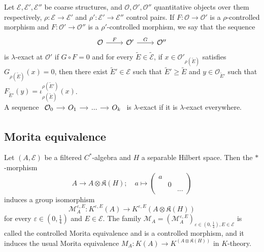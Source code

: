 \begin{definition}
Let $\mathcal E,\mathcal E',\mathcal E''$ be coarse structures, and $ \mathcal O,\mathcal O',\mathcal O''$ quantitative objects over them respectively, $\rho : \mathcal E\rightarrow \mathcal E'$ and $\rho' : \mathcal E'\rightarrow \mathcal E''$ control pairs. If $F : \mathcal O\rightarrow \mathcal O'$ is a $\rho$-controlled morphism and $F : \mathcal O'\rightarrow \mathcal O''$ is a $\rho'$-controlled morphism, we say that the sequence 
\[\begin{tikzcd}\mathcal O\arrow{r}{F} & \mathcal O'\arrow{r}{G} & \mathcal O''\end{tikzcd}\] 
is $\lambda$-exact at $\mathcal O'$ if $G\circ F = 0$ and for every $\tilde{ E}\in \tilde{\mathcal E}$, if $x \in \mathcal O'_{\rho (\tilde{E})}$ satisfies $G_{\rho (\tilde E)}(x)=0$, then there exist $\tilde E'\in \mathcal E$ such that $\tilde E'\geq \tilde E$ and $y\in \mathcal O_{\tilde E'}$ such that $F_{\tilde E'}(y)=\iota_{\rho(\tilde E)}^{\rho(\tilde E')}(x) $.\\

A sequence $\begin{tikzcd}[column sep = small]\mathcal O_0 \arrow{r} & O_1 \arrow{r}&... \arrow{r}& O_k\end{tikzcd}$ is $\lambda$-exact if it is $\lambda$-exact everywhere.
\end{definition}

\subsection{Morita equivalence}

\begin{prop}
Let $(A,\mathcal E)$ be a filtered $C^*$-algebra and $H$ a separable Hilbert space. Then the $*$-morphism
\[A\rightarrow A\otimes \mathfrak K(H) ; \quad a\mapsto 
\begin{pmatrix}a & & \\  & 0 & \\ & & ... \end{pmatrix}\]
induces a group isomorphism 
\[\mathcal M_A^{\varepsilon,E} : K^{\varepsilon,E}(A)\rightarrow K^{\varepsilon,E}(A\otimes \mathfrak K(H)) \]
for every $\varepsilon\in(0,\frac{1}{4})$ and $E\in\mathcal E$. The family $\mathcal M_A = (\mathcal M_A^{\varepsilon,E} )_{\varepsilon\in(0,\frac{1}{4}),E\in\mathcal E}$ is called the controlled Morita equivalence and is a controlled morphism, and it induces the usual Morita equivalence $M_A: K(A)\rightarrow K^(A\otimes \mathfrak K(H))$ in $K$-theory. 
\end{prop}

